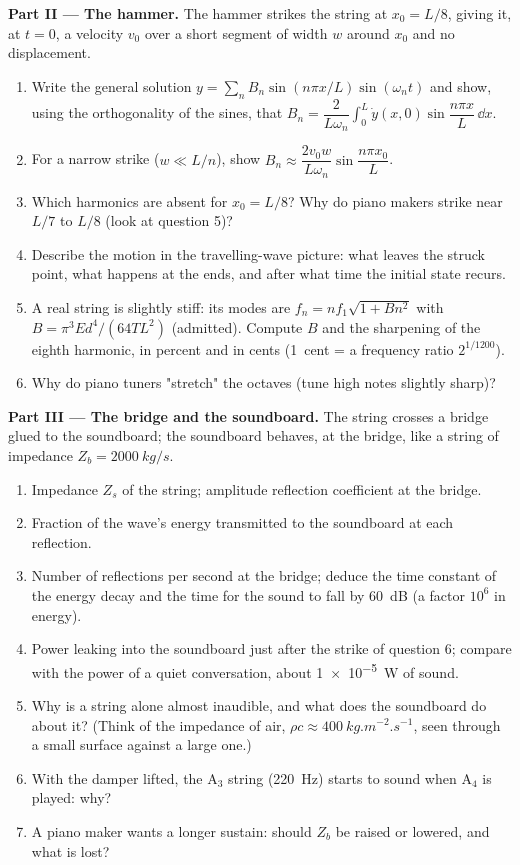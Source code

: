 \begin{problem}
\medskip
\noindent\textbf{Part II --- The hammer.}
The hammer strikes the string at $x_0 = L/8$, giving it, at $t = 0$, a
velocity $v_0$ over a short segment of width $w$ around $x_0$ and no
displacement.
\begin{enumerate}[resume]
  \item Write the general solution $y = \sum_nB_n\sin(n\pi x/L)\sin(\omega_nt)$
        and show, using the orthogonality of the sines, that $B_n =
        \dfrac{2}{L\omega_n}\int_0^L\dot y(x, 0)\sin\dfrac{n\pi x}L\,\dd x$.
  \item For a narrow strike ($w \ll L/n$), show $B_n \approx \dfrac{2v_0w}
        {L\omega_n}\sin\dfrac{n\pi x_0}{L}$.
  \item Which harmonics are absent for $x_0 = L/8$? Why do piano
        makers strike near $L/7$ to $L/8$ (look at question 5)?
  \item Describe the motion in the travelling-wave picture: what
        leaves the struck point, what happens at the ends, and after
        what time the initial state recurs.
  \item A real string is slightly stiff: its modes are $f_n = nf_1
        \sqrt{1 + Bn^2}$ with $B = \pi^3Ed^4/(64TL^2)$ (admitted). Compute
        $B$ and the sharpening of the eighth harmonic, in percent and
        in cents (\qty{1}{cent} = a frequency ratio $2^{1/1200}$).
  \item Why do piano tuners "stretch" the octaves (tune high notes
        slightly sharp)?
\end{enumerate}

\medskip
\noindent\textbf{Part III --- The bridge and the soundboard.}
The string crosses a bridge glued to the soundboard; the soundboard
behaves, at the bridge, like a string of impedance $Z_b = \qty{2000}{kg/s}$.
\begin{enumerate}[resume]
  \item Impedance $Z_s$ of the string; amplitude reflection coefficient
        at the bridge.
  \item Fraction of the wave's energy transmitted to the soundboard at
        each reflection.
  \item Number of reflections per second at the bridge; deduce the time
        constant of the energy decay and the time for the sound to fall
        by \qty{60}{dB} (a factor $10^6$ in energy).
  \item Power leaking into the soundboard just after the strike of
        question 6; compare with the power of a quiet conversation,
        about \qty{1e-5}{W} of sound.
  \item Why is a string alone almost inaudible, and what does the
        soundboard do about it? (Think of the impedance of air,
        $\rho c \approx \qty{400}{kg.m^{-2}.s^{-1}}$, seen through a small
        surface against a large one.)
  \item With the damper lifted, the A$_3$ string (\qty{220}{Hz}) starts to
        sound when A$_4$ is played: why?
  \item A piano maker wants a longer sustain: should $Z_b$ be raised or
        lowered, and what is lost?
\end{enumerate}


\end{problem}
